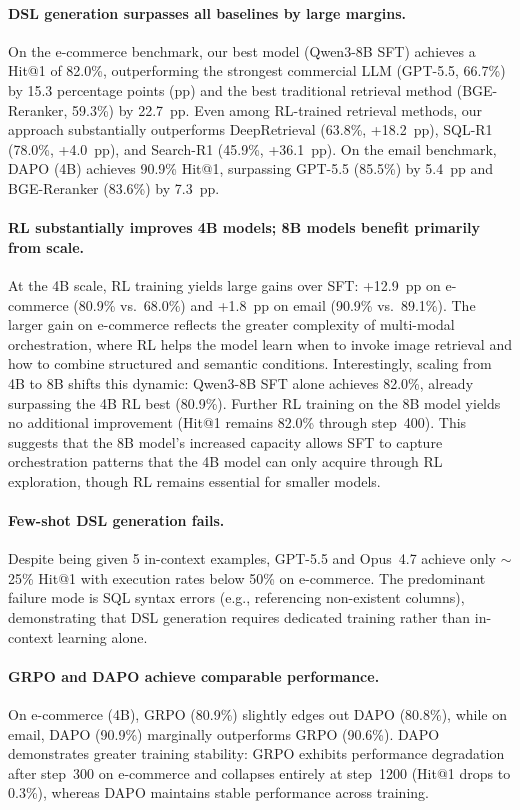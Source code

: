 \documentclass[11pt]{article}
\begin{document}
\paragraph{DSL generation surpasses all baselines by large margins.}
On the e-commerce benchmark, our best model (Qwen3-8B SFT) achieves a Hit@1 of 82.0\%, outperforming the strongest commercial LLM (GPT-5.5, 66.7\%) by 15.3 percentage points (pp) and the best traditional retrieval method (BGE-Reranker, 59.3\%) by 22.7~pp. Even among RL-trained retrieval methods, our approach substantially outperforms DeepRetrieval (63.8\%, +18.2~pp), SQL-R1 (78.0\%, +4.0~pp), and Search-R1 (45.9\%, +36.1~pp). On the email benchmark, DAPO (4B) achieves 90.9\% Hit@1, surpassing GPT-5.5 (85.5\%) by 5.4~pp and BGE-Reranker (83.6\%) by 7.3~pp.

\paragraph{RL substantially improves 4B models; 8B models benefit primarily from scale.}
At the 4B scale, RL training yields large gains over SFT: +12.9~pp on e-commerce (80.9\% vs.\ 68.0\%) and +1.8~pp on email (90.9\% vs.\ 89.1\%). The larger gain on e-commerce reflects the greater complexity of multi-modal orchestration, where RL helps the model learn when to invoke image retrieval and how to combine structured and semantic conditions.
Interestingly, scaling from 4B to 8B shifts this dynamic: Qwen3-8B SFT alone achieves 82.0\%, already surpassing the 4B RL best (80.9\%). Further RL training on the 8B model yields no additional improvement (Hit@1 remains 82.0\% through step~400). This suggests that the 8B model's increased capacity allows SFT to capture orchestration patterns that the 4B model can only acquire through RL exploration, though RL remains essential for smaller models.

\paragraph{Few-shot DSL generation fails.}
Despite being given 5 in-context examples, GPT-5.5 and Opus~4.7 achieve only $\sim$25\% Hit@1 with execution rates below 50\% on e-commerce. The predominant failure mode is SQL syntax errors (e.g., referencing non-existent columns), demonstrating that DSL generation requires dedicated training rather than in-context learning alone.

\paragraph{GRPO and DAPO achieve comparable performance.}
On e-commerce (4B), GRPO (80.9\%) slightly edges out DAPO (80.8\%), while on email, DAPO (90.9\%) marginally outperforms GRPO (90.6\%). DAPO demonstrates greater training stability: GRPO exhibits performance degradation after step~300 on e-commerce and collapses entirely at step~1200 (Hit@1 drops to 0.3\%), whereas DAPO maintains stable performance across training.
\end{document}
